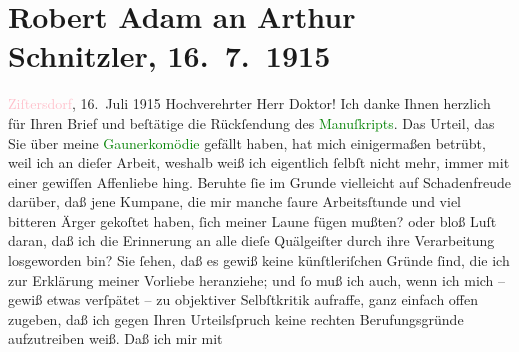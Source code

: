 

               \section[Robert Adam an Arthur Schnitzler, 16. 7. 1915]{ Robert Adam an Arthur Schnitzler, 16. 7. 1915}\nopagebreak{}\rehead{ }\normalsize\beginnumbering{} \toendnotes[C]{\smallbreak\pagebreak[2]} 
\toendnotes[C]{\smallbreak}\pstart
           \raggedleft{}{\pb}\textcolor{pink}{Ziſtersdorf}{}\ledrightnote{\textcolor{pink}{Zistersdorf}}, 16. Juli 1915\pend
           \pstart{}Hochverehrter Herr Doktor!\pend\pstart
           Ich danke Ihnen herzlich für Ihren Brief und beſtätige die Rückſendung des \textcolor{green}{Manuſkripts}{}.\pend
           \pstart
           Das Urteil, das Sie über meine \textcolor{green}{Gaunerkomödie}{} gefällt haben, hat mich einigermaßen betrübt, weil ich
                    an dieſer Arbeit, weshalb weiß ich eigentlich ſelbſt nicht mehr, immer mit einer
                    gewiſſen Affenliebe hing. Beruhte ſie im Grunde vielleicht auf Schadenfreude
                    darüber, daß jene Kumpane, die mir manche ſaure Arbeitsſtunde und viel bitteren
                    Ärger gekoſtet haben, ſich meiner Laune fügen mußten? oder bloß \label{T_L02215_1v}\label{T_L02215_1h} Luſt daran,
                    daß ich die Erinnerung an alle dieſe Quälgeiſter durch ihre Verarbeitung
                    losgeworden bin?\pend
           \pstart
           Sie ſehen, daß es gewiß keine künſtleriſchen Gründe ſind, die ich zur Erklärung
                    meiner Vorliebe heranziehe; und ſo muß ich auch, wenn {\pb}ich mich – gewiß etwas verſpätet – zu objektiver
                    Selbſtkritik aufraffe, ganz einfach offen zugeben, daß ich gegen Ihren
                    Urteilsſpruch keine rechten Berufungsgründe aufzutreiben weiß. Daß ich mir mit
